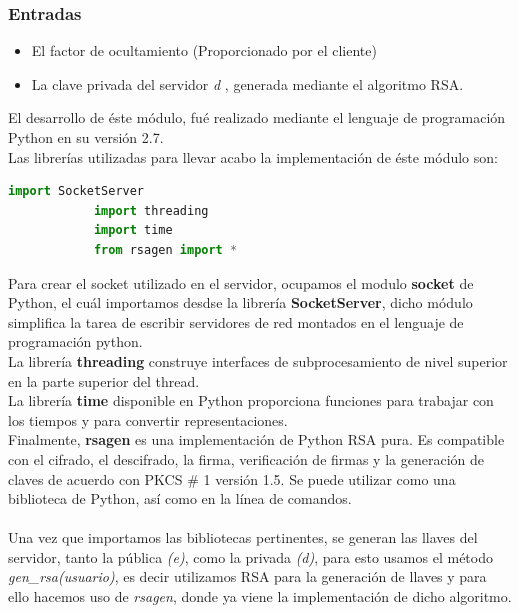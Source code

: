 \subsubsection{Entradas}
\begin{itemize}
	\item El factor de ocultamiento (Proporcionado por el cliente)
	\item La clave privada del servidor \textit{d} , generada mediante el algoritmo RSA. 
\end{itemize}

El desarrollo de éste módulo, fué realizado mediante el lenguaje de programación Python en su versión 2.7. \\
Las librerías utilizadas para llevar acabo la implementación de éste módulo son: 

\begin{lstlisting}[language=Python,frame=single, keywordstyle=\color{blue},showstringspaces=false]
			import SocketServer
			import threading
			import time
			from rsagen import *
\end{lstlisting}

Para crear el socket utilizado en el servidor, ocupamos el modulo \textbf{socket} de Python, el cuál importamos desdse la librería \textbf{SocketServer}, dicho módulo simplifica la tarea de escribir servidores de red montados en el lenguaje de programación python. \\ La librería \textbf{threading} construye interfaces de subprocesamiento de nivel superior en la parte superior del thread.\\
La librería \textbf{time} disponible en Python proporciona funciones para trabajar con los tiempos y para convertir representaciones. \\
Finalmente,\textbf{ rsagen} es una implementación de Python RSA pura. Es compatible con el cifrado,  el descifrado, la firma, verificación de firmas y la generación de claves de acuerdo con PKCS \# 1 versión 1.5. Se puede utilizar como una biblioteca de Python, así como en la línea de comandos.
\\ \\ 

Una vez que importamos las bibliotecas pertinentes, se generan las llaves del servidor, tanto la pública \textit{(e)}, como la privada \textit{(d)}, para esto usamos el método \textit{gen\_rsa(usuario)}, es decir utilizamos RSA para la generación de llaves y para ello hacemos uso de \textit{rsagen}, donde ya viene la implementación de dicho algoritmo. \\ 

